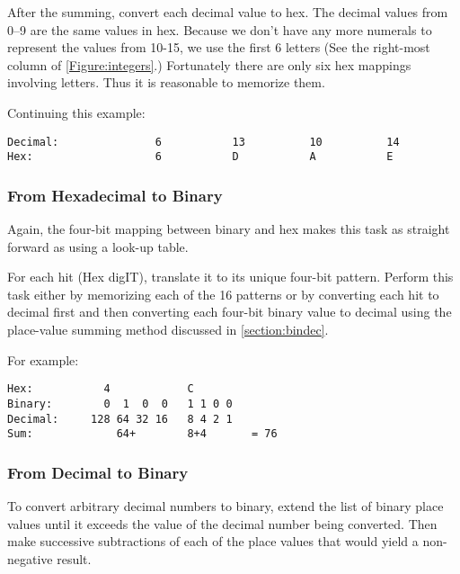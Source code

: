 After the summing, convert each decimal value to hex.  The decimal
values from 0--9 are the same values in hex.  Because we don't have any
more numerals to represent the values from 10-15, we use the first 6
letters (See the right-most column of \autoref{Figure:integers}.)
Fortunately there are only six hex mappings involving letters.  Thus 
it is reasonable to memorize them.

Continuing this example:

\begin{verbatim}
Decimal:               6           13          10          14
Hex:                   6           D           A           E
\end{verbatim}



\subsubsection{From Hexadecimal to Binary}

Again, the four-bit mapping between binary and hex makes this
task as straight forward as using a look-up table.

For each \gls{hit} (Hex digIT), translate it to its unique four-bit pattern.
Perform this task either by memorizing each of the 16 patterns 
or by converting each hit to decimal first and then converting
each four-bit binary value to decimal using the place-value summing 
method discussed in \autoref{section:bindec}.

For example:

\begin{verbatim}
Hex:           4            C
Binary:        0  1  0  0   1 1 0 0
Decimal:     128 64 32 16   8 4 2 1
Sum:             64+        8+4       = 76
\end{verbatim}


\subsubsection{From Decimal to Binary}

To convert arbitrary decimal numbers to binary, extend the list 
of binary place values until it exceeds the value of the decimal 
number being converted.  Then make successive subtractions of each 
of the place values that would yield a non-negative result.

